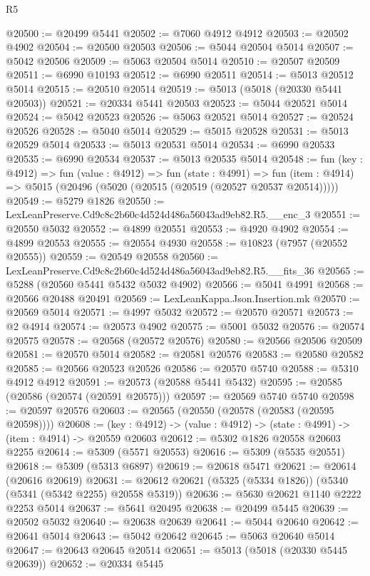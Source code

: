 \begin{lexlean}{R5}
\begin{coremodule}
@20500 := @20499 @5441
@20502 := @7060 @4912 @4912
@20503 := @20502 @4902
@20504 := @20500 @20503
@20506 := @5044 @20504 @5014
@20507 := @5042 @20506
@20509 := @5063 @20504 @5014
@20510 := @20507 @20509
@20511 := @6990 @10193
@20512 := @6990 @20511
@20514 := @5013 @20512 @5014
@20515 := @20510 @20514
@20519 := @5013 (@5018 (@20330 @5441 @20503))
@20521 := @20334 @5441 @20503
@20523 := @5044 @20521 @5014
@20524 := @5042 @20523
@20526 := @5063 @20521 @5014
@20527 := @20524 @20526
@20528 := @5040 @5014
@20529 := @5015 @20528
@20531 := @5013 @20529 @5014
@20533 := @5013 @20531 @5014
@20534 := @6990 @20533
@20535 := @6990 @20534
@20537 := @5013 @20535 @5014
@20548 := fun (key : @4912) =>
  fun (value : @4912) =>
  fun (state : @4991) =>
  fun (item : @4914) => @5015 (@20496 (@5020 (@20515 (@20519 (@20527 @20537 @20514)))))
@20549 := @5279 @1826
@20550 := LexLeanPreserve.Cd9c8c2b60c4d524d486a56043ad9eb82.R5.__enc_3
@20551 := @20550 @5032
@20552 := @4899 @20551
@20553 := @4920 @4902
@20554 := @4899 @20553
@20555 := @20554 @4930
@20558 := @10823 (@7957 (@20552 @20555))
@20559 := @20549 @20558
@20560 := LexLeanPreserve.Cd9c8c2b60c4d524d486a56043ad9eb82.R5.__fits_36
@20565 := @5288 (@20560 @5441 @5432 @5032 @4902)
@20566 := @5041 @4991
@20568 := @20566 @20488 @20491
@20569 := LexLeanKappa.Json.Insertion.mk
@20570 := @20569 @5014
@20571 := @4997 @5032
@20572 := @20570 @20571
@20573 := @2 @4914
@20574 := @20573 @4902
@20575 := @5001 @5032
@20576 := @20574 @20575
@20578 := @20568 (@20572 @20576)
@20580 := @20566 @20506 @20509
@20581 := @20570 @5014
@20582 := @20581 @20576
@20583 := @20580 @20582
@20585 := @20566 @20523 @20526
@20586 := @20570 @5740
@20588 := @5310 @4912 @4912
@20591 := @20573 (@20588 @5441 @5432)
@20595 := @20585 (@20586 (@20574 (@20591 @20575)))
@20597 := @20569 @5740 @5740
@20598 := @20597 @20576
@20603 := @20565 (@20550 (@20578 (@20583 (@20595 @20598))))
@20608 := (key : @4912) -> (value : @4912) -> (state : @4991) -> (item : @4914) -> @20559 @20603
@20612 := @5302 @1826 @20558 @20603 @2255
@20614 := @5309 (@5571 @20553)
@20616 := @5309 (@5535 @20551)
@20618 := @5309 (@5313 @6897)
@20619 := @20618 @5471
@20621 := @20614 (@20616 @20619)
@20631 := @20612 @20621 (@5325 (@5334 @1826)) (@5340 (@5341 (@5342 @2255) @20558 @5319))
@20636 := @5630 @20621 @1140 @2222 @2253 @5014
@20637 := @5641 @20495
@20638 := @20499 @5445
@20639 := @20502 @5032
@20640 := @20638 @20639
@20641 := @5044 @20640
@20642 := @20641 @5014
@20643 := @5042 @20642
@20645 := @5063 @20640 @5014
@20647 := @20643 @20645 @20514
@20651 := @5013 (@5018 (@20330 @5445 @20639))
@20652 := @20334 @5445

\end{coremodule}
\end{lexlean}
